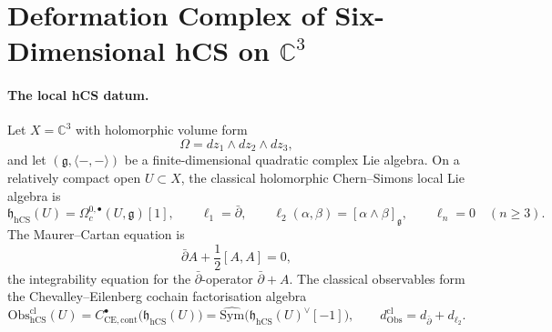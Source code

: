 \providecommand{\Obs}{\mathrm{Obs}}
\providecommand{\hCS}{\mathrm{hCS}}
\providecommand{\Ch}{\mathrm{Ch}}
\providecommand{\Dolb}{\mathrm{Dolb}}
\providecommand{\Conf}{\mathrm{Conf}}
\providecommand{\Fact}{\mathrm{Fact}}
\providecommand{\HH}{\mathrm{HH}}
\providecommand{\Def}{\mathrm{Def}}
\providecommand{\CE}{\mathrm{CE}}
\providecommand{\Sym}{\mathrm{Sym}}
\providecommand{\Hol}{\mathrm{Hol}}
\providecommand{\Tr}{\operatorname{Tr}}
\providecommand{\Rep}{\mathrm{Rep}}
\providecommand{\Alg}{\mathrm{Alg}}
\providecommand{\MC}{\mathrm{MC}}
\providecommand{\End}{\operatorname{End}}
\providecommand{\BV}{\mathrm{BV}}
\providecommand{\dbar}{\bar\partial}
\providecommand{\C}{\mathbb{C}}
\providecommand{\cO}{\mathcal{O}}
\providecommand{\cE}{\mathcal{E}}
\providecommand{\cA}{\mathcal{A}}
\providecommand{\fg}{\mathfrak{g}}
\providecommand{\fh}{\mathfrak{h}}
\providecommand{\fa}{\mathfrak{a}}
\providecommand{\Eone}{E_1}
\providecommand{\Etwo}{E_2}
\providecommand{\Ethree}{E_3}
\providecommand{\PhiFA}{\Phi^{\mathrm{FA}}}
\providecommand{\SpCh}{\mathrm{Sp}^{\mathrm{ch}}}
\providecommand{\Zchder}{Z^{\mathrm{der}}_{\mathrm{ch}}}

\section*{Deformation Complex of Six-Dimensional hCS on $\C^3$}

\paragraph{The local hCS datum.}
Let \(X=\C^3\) with holomorphic volume form
\[
  \Omega=dz_1\wedge dz_2\wedge dz_3,
\]
and let \((\fg,\langle-,-\rangle)\) be a finite-dimensional quadratic
complex Lie algebra. On a relatively compact open \(U\subset X\), the
classical holomorphic Chern--Simons local Lie algebra is
\[
  \fh_{\hCS}(U)
  =
  \Omega^{0,\bullet}_c(U,\fg)[1],
  \qquad
  \ell_1=\dbar,
  \qquad
  \ell_2(\alpha,\beta)=[\alpha\wedge\beta]_{\fg},
  \qquad
  \ell_n=0\quad(n\geq3).
\]
The Maurer--Cartan equation is
\[
  \dbar A+\frac12[A,A]=0,
\]
the integrability equation for the \(\dbar\)-operator
\(\dbar+A\). The classical observables form the Chevalley--Eilenberg
cochain factorisation algebra
\[
  \Obs^{\mathrm{cl}}_{\hCS}(U)
  =
  C^\bullet_{\CE,\mathrm{cont}}\bigl(\fh_{\hCS}(U)\bigr)
  =
  \widehat{\Sym}\bigl(\fh_{\hCS}(U)^\vee[-1]\bigr),
  \qquad
  d_{\Obs}^{\mathrm{cl}}=d_{\dbar}+d_{\ell_2}.
\]

